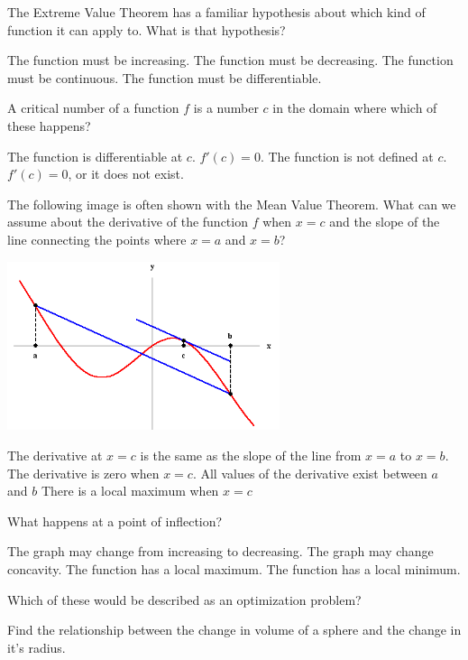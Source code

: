 \documentclass{exam}
\begin{document}
\begin{questions}
\begin{choices}
\end{choices}
\question The Extreme Value Theorem has a familiar hypothesis about which kind of function it can apply to. What is that hypothesis?
\begin{choices}
\choice The function must be increasing.
\choice The function must be decreasing.
\choice The function must be continuous.
\choice The function must be differentiable.
\end{choices}
\newpage
\question A critical number of a function $f$ is a number $c$ in the domain where which of these happens?\\
\begin{choices}
\choice The function is differentiable at $c$.
\choice $f'(c) = 0$.
\choice The function is not defined at $c$.
\choice $f'(c) = 0$, or it does not exist.
\end{choices}
\question The following image is often shown with the Mean Value Theorem. What can we assume about the derivative of the function $f$ when $x=c$ and the slope of the line connecting the points where $x=a$ and $x=b$?
\begin{center}
\includegraphics[width=0.6\textwidth]{Image01}
\end{center}
\begin{choices}
\choice The derivative at $x=c$ is the same as the slope of the line from $x=a$ to $x=b$.
\choice The derivative is zero when $x=c$.
\choice All values of the derivative exist between $a$ and $b$
\choice There is a local maximum when $x=c$
\end{choices}
\question What happens at a point of inflection?
\begin{choices}
\choice The graph may change from increasing to decreasing.
\choice The graph may change concavity.
\choice The function has a local maximum.
\choice The function has a local minimum.
\end{choices}
\question
Which of these would be described as an optimization problem?
\begin{choices}
\choice Find the relationship between the change in volume of a sphere and the change in it's radius.

\end{choices}
\end{questions}
\end{document}
